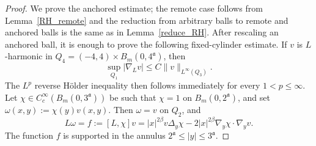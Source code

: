 \documentclass[12pt]{amsart}
\begin{document}
\begin{proof}
We prove the anchored estimate; the remote case follows from Lemma~\ref{RH_remote} and the reduction from arbitrary balls to remote and anchored balls is the same as in Lemma~\ref{reduce_RH}. After rescaling an anchored ball, it is enough to prove the following fixed-cylinder estimate. If $v$ is $L$-harmonic in $Q_4=(-4,4)\times B_m(0,4^{\mathfrak a})$, then
\begin{equation*}
    \sup_{Q_1}|\nabla_L v| \le C\|v\|_{L^\infty(Q_3)}.
\end{equation*}
The $L^p$ reverse H\"older inequality then follows immediately for every
$1<p\le \infty$. Let $\chi\in C_c^\infty(B_m(0,3^{\mathfrak a}))$ be such that $\chi=1$ on $B_m(0,2^{\mathfrak a})$, and set $\omega(x,y):=\chi(y)v(x,y)$. Then $\omega=v$ on $Q_2$, and
\begin{equation*}
L\omega=f:=[L,\chi]v = |x|^{2\beta}v\Delta_y\chi - 2|x|^{2\beta}\nabla_y\chi\cdot\nabla_yv.
\end{equation*}
The function $f$ is supported in the annulus $2^{\mathfrak a}\leq |y|\leq 3^{\mathfrak a}$.


\end{proof}
\end{document}
